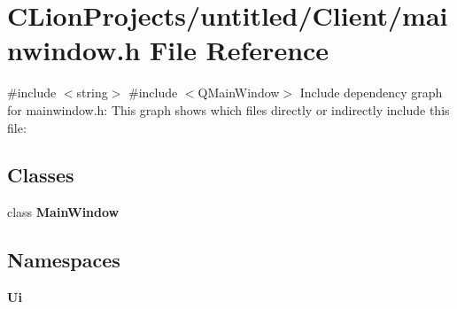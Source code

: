 \section{C\+Lion\+Projects/untitled/\+Client/mainwindow.h File Reference}
\label{mainwindow_8h}
{\ttfamily \#include $<$string$>$}\newline
{\ttfamily \#include $<$Q\+Main\+Window$>$}\newline
Include dependency graph for mainwindow.\+h\+:
This graph shows which files directly or indirectly include this file\+:
\subsection*{Classes}
\begin{DoxyCompactItemize}
\item 
class \textbf{ Main\+Window}
\end{DoxyCompactItemize}
\subsection*{Namespaces}
\begin{DoxyCompactItemize}
\item 
 \textbf{ Ui}
\end{DoxyCompactItemize}
